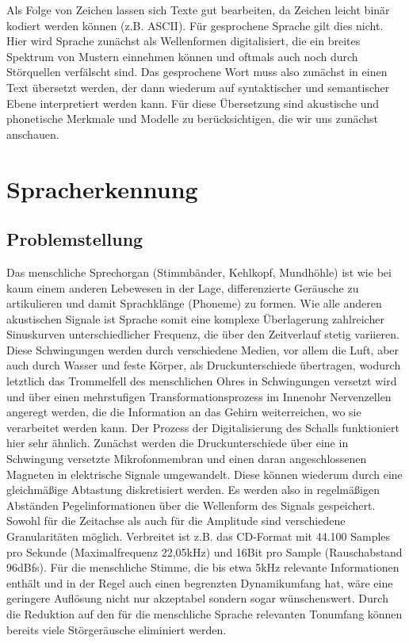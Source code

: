 Als Folge von Zeichen lassen sich Texte gut bearbeiten, da Zeichen leicht binär kodiert werden können (z.B. ASCII).
Für gesprochene Sprache gilt dies nicht.
Hier wird Sprache zunächst als Wellenformen digitalisiert, die ein breites Spektrum von Mustern einnehmen können und oftmals auch noch durch Störquellen verfälscht sind.
Das gesprochene Wort muss also zunächst in einen Text übersetzt werden, der dann wiederum auf syntaktischer und semantischer Ebene interpretiert werden kann.
Für diese Übersetzung sind akustische und phonetische Merkmale und Modelle zu berücksichtigen, die wir uns zunächst anschauen.

\section{Spracherkennung}
\subsection{Problemstellung}
Das menschliche Sprechorgan (Stimmbänder, Kehlkopf, Mundhöhle) ist wie bei kaum einem anderen Lebewesen in der Lage, differenzierte Geräusche zu artikulieren und damit Sprachklänge (Phoneme) zu formen.
Wie alle anderen akustischen Signale ist Sprache somit eine komplexe Überlagerung zahlreicher Sinuskurven unterschiedlicher Frequenz, die über den Zeitverlauf stetig variieren.
Diese Schwingungen werden durch verschiedene Medien, vor allem die Luft, aber auch durch Wasser und feste Körper, als Druckunterschiede übertragen, wodurch letztlich das Trommelfell des menschlichen Ohres in Schwingungen versetzt wird und über einen mehrstufigen Transformationsprozess im Innenohr Nervenzellen angeregt werden, die die Information an das Gehirn weiterreichen, wo sie verarbeitet werden kann.
Der Prozess der Digitalisierung des Schalls funktioniert hier sehr ähnlich.
Zunächst werden die Druckunterschiede über eine in Schwingung versetzte Mikrofonmembran und einen daran angeschlossenen Magneten in elektrische Signale umgewandelt.
Diese können wiederum durch eine gleichmäßige Abtastung diskretisiert werden.
Es werden also in regelmäßigen Abständen Pegelinformationen über die Wellenform des Signals gespeichert.
Sowohl für die Zeitachse als auch für die Amplitude sind verschiedene Granularitäten möglich.
Verbreitet ist z.B.
das CD-Format mit 44.100 Samples pro Sekunde (Maximalfrequenz 22,05kHz) und 16Bit pro Sample (Rauschabstand 96dBfs).
Für die menschliche Stimme, die bis etwa 5kHz relevante Informationen enthält und in der Regel auch einen begrenzten Dynamikumfang hat, wäre eine geringere Auflösung nicht nur akzeptabel sondern sogar wünschenswert.
Durch die Reduktion auf den für die menschliche Sprache relevanten Tonumfang können bereits viele Störgeräusche eliminiert werden.


